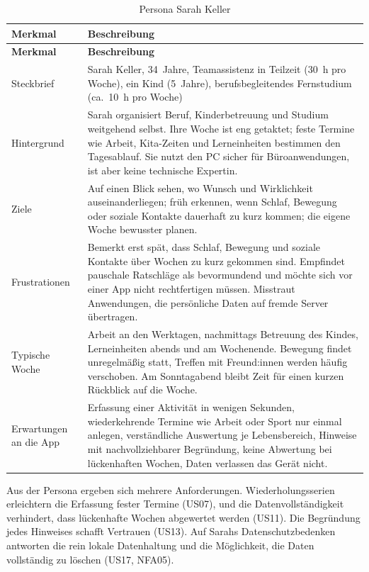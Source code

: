\begingroup\tabsatz
\begin{longtable}{@{}L{3.4cm}L{11.8cm}@{}}
  \caption{Persona Sarah Keller}\label{tab:persona}\\
  \toprule
  \textbf{Merkmal} & \textbf{Beschreibung} \\
  \midrule
  \endfirsthead
  \toprule
  \textbf{Merkmal} & \textbf{Beschreibung} \\
  \midrule
  \endhead
  \endfoot
  \bottomrule
  \endlastfoot
  Steckbrief & Sarah Keller, 34~Jahre, Teamassistenz in Teilzeit (30~h pro Woche), ein Kind (5~Jahre), berufsbegleitendes Fernstudium (ca.~10~h pro Woche) \\
  \midrule
  Hintergrund & Sarah organisiert Beruf, Kinderbetreuung und Studium weitgehend selbst. Ihre Woche ist eng getaktet; feste Termine wie Arbeit, Kita-Zeiten und Lerneinheiten bestimmen den Tagesablauf. Sie nutzt den PC sicher für Büroanwendungen, ist aber keine technische Expertin. \\
  \midrule
  Ziele & Auf einen Blick sehen, wo Wunsch und Wirklichkeit auseinanderliegen; früh erkennen, wenn Schlaf, Bewegung oder soziale Kontakte dauerhaft zu kurz kommen; die eigene Woche bewusster planen. \\
  \midrule
  Frustrationen & Bemerkt erst spät, dass Schlaf, Bewegung und soziale Kontakte über Wochen zu kurz gekommen sind. Empfindet pauschale Ratschläge als bevormundend und möchte sich vor einer App nicht rechtfertigen müssen. Misstraut Anwendungen, die persönliche Daten auf fremde Server übertragen. \\
  \midrule
  Typische Woche & Arbeit an den Werktagen, nachmittags Betreuung des Kindes, Lerneinheiten abends und am Wochenende. Bewegung findet unregelmäßig statt, Treffen mit Freund:innen werden häufig verschoben. Am Sonntagabend bleibt Zeit für einen kurzen Rückblick auf die Woche. \\
  \midrule
  Erwartungen an die App & Erfassung einer Aktivität in wenigen Sekunden, wiederkehrende Termine wie Arbeit oder Sport nur einmal anlegen, verständliche Auswertung je Lebensbereich, Hinweise mit nachvollziehbarer Begründung, keine Abwertung bei lückenhaften Wochen, Daten verlassen das Gerät nicht. \\
\end{longtable}
\endgroup
{}

Aus der Persona ergeben sich mehrere Anforderungen. Wiederholungsserien erleichtern die Erfassung fester Termine (US07), und die Datenvollständigkeit verhindert, dass lückenhafte Wochen abgewertet werden (US11). Die Begründung jedes Hinweises schafft Vertrauen (US13). Auf Sarahs Datenschutzbedenken antworten die rein lokale Datenhaltung und die Möglichkeit, die Daten vollständig zu löschen (US17, NFA05).
